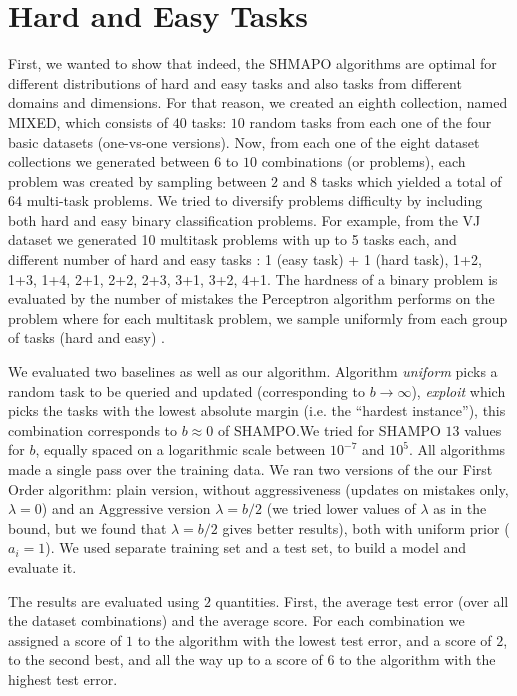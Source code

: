 \section{Hard and Easy Tasks }
First, we wanted to show that indeed, the SHMAPO algorithms are optimal for different distributions of hard and
 easy tasks and also tasks from different domains and dimensions. For that reason, we created an eighth 
 collection, named MIXED, which consists of $40$ tasks: $10$ random tasks from each one of the four 
 basic datasets (one-vs-one versions). Now, from each one of the eight dataset collections we generated 
 between $6$ to $10$ combinations (or problems), each problem was created by sampling between 
 $2$ and $8$ tasks which yielded a total of $64$ multi-task problems. 
We tried to diversify problems difficulty by including both hard and easy binary classification problems.
For example, from the VJ dataset we generated 10 multitask problems with up to 5 tasks each, and different 
number of hard and easy tasks : 1 (easy task) + 1 (hard task), 1+2, 1+3, 1+4, 2+1, 2+2, 2+3, 3+1, 3+2, 4+1.
The hardness of a binary problem is evaluated by the number of mistakes the Perceptron algorithm performs 
on the problem where for each multitask problem, we sample uniformly from each group of tasks 
(hard and easy) .

We evaluated two baselines as well as our algorithm. Algorithm {\em uniform} picks a random task to be 
queried and updated (corresponding to $b\rightarrow\infty$), {\em exploit} which picks the tasks with the 
lowest absolute margin (i.e. the ``hardest instance''), this combination corresponds to $b \approx 0$ of 
SHAMPO.\@ We tried for SHAMPO $13$ values for $b$, equally spaced on a logarithmic scale between 
$10^{-7}$ and $10^{5}$. 
All algorithms made a single pass over the training data.  We ran two versions of the our First Order algorithm: 
plain version, without aggressiveness (updates on mistakes only, $\lambda=0$) and an 
Aggressive version $\lambda=b/2$ (we tried lower values of $\lambda$ as in the bound, 
but we found that $\lambda=b/2$ gives better results), both with uniform prior ($a_i=1$). 
We used separate training set and a test set, to build a model and evaluate it.

The results are evaluated using $2$ quantities. First, the average test error (over all the dataset combinations) 
and the average score. For each combination we assigned a score of $1$ to the algorithm with the lowest 
test error, and a score of $2$, to the second best, and all the way up to a score of $6$ to the algorithm with 
the highest test error.



